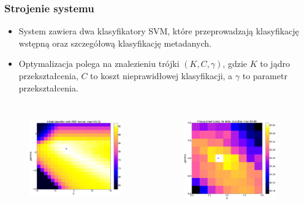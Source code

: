 \documentclass[11pt,t]{beamer}
\begin{document}
\begin{frame}
\frametitle{Strojenie systemu}
\begin{itemize}
\item System zawiera dwa klasyfikatory SVM, które przeprowadzają klasyfikację wstępną oraz szczegółową klasyfikację metadanych.
\item Optymalizacja polega na znalezieniu trójki $(K,C,\gamma)$, gdzie $K$ to jądro przekształcenia, $C$ to koszt nieprawidłowej klasyfikacji, a $\gamma$ to parametr przekształcenia.
\end{itemize}
\begin{columns}
\begin{figure}[]
  \centering
  \includegraphics[width=4cm]{../plots/init_rbf.png}
  \label{fig:pipeline}
\end{figure}
\begin{figure}[]
  \centering
  \includegraphics[width=4cm]{../plots/init_fine.png}
  \label{fig:pipeline}
\end{figure}
\end{columns}

\end{frame}


\end{document}
